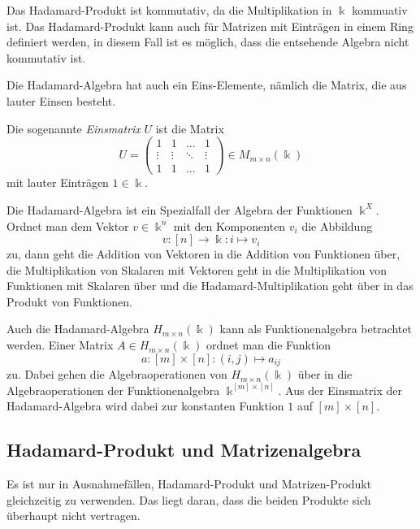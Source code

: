 Das Hadamard-Produkt ist kommutativ, da die Multiplikation in $\Bbbk$
kommuativ ist.
Das Hadamard-Produkt kann auch für Matrizen mit Einträgen in einem
Ring definiert werden, in diesem Fall ist es möglich, dass die entsehende
Algebra nicht kommutativ ist.

Die Hadamard-Algebra hat auch ein Eins-Elemente, nämlich die Matrix,
die aus lauter Einsen besteht.

\begin{definition}
Die sogenannte {\em Einsmatrix} $U$ ist die Matrix
\[
U=\begin{pmatrix}
1&1&\dots&1\\
\vdots&\vdots&\ddots&\vdots\\
1&1&\dots&1
\end{pmatrix}
\in
M_{m\times n}(\Bbbk)
\]
mit lauter Einträgen $1\in\Bbbk$.
\end{definition}

Die Hadamard-Algebra ist ein Spezialfall der Algebra der Funktionen
$\Bbbk^X$.
Ordnet man dem Vektor $v\in \Bbbk^n$ mit den Komponenten $v_i$ 
die Abbildung
\[
v\colon [n] \to \Bbbk: i \mapsto v_i
\]
zu, dann geht die Addition von Vektoren in die Addition von
Funktionen über, die Multiplikation von Skalaren mit Vektoren
geht in die Multiplikation von Funktionen mit Skalaren über 
und die Hadamard-Multiplikation geht über in das Produkt von
Funktionen.

Auch die Hadamard-Algebra $H_{m\times n}(\Bbbk)$ kann als Funktionenalgebra
betrachtet werden.
Einer Matrix $A\in H_{m\times n}(\Bbbk)$ ordnet man die Funktion
\[
a\colon [m]\times [n] : (i,j) \mapsto a_{ij}
\]
zu.
Dabei gehen die Algebraoperationen von $H_{m\times n}(\Bbbk)$ über
in die Algebraoperationen der Funktionenalgebra $\Bbbk^{[m]\times [n]}$.
Aus der Einsmatrix der Hadamard-Algebra wird dabei zur konstanten
Funktion $1$ auf $[m]\times[n]$.

\subsection{Hadamard-Produkt und Matrizenalgebra
\label{buch:vektorenmatrizen:subsection:vertraeglichkeit}}
Es ist nur in Ausnahmefällen, Hadamard-Produkt und Matrizen-Produkt
gleichzeitig zu verwenden.
Das liegt daran, dass die beiden Produkte sich überhaupt nicht 
vertragen.

